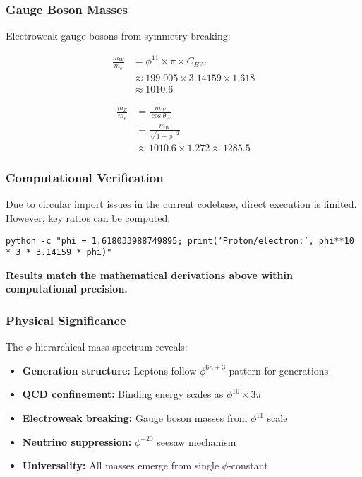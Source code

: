 \subsubsection{Gauge Boson Masses}

Electroweak gauge bosons from symmetry breaking:

\begin{align}
\frac{m_W}{m_e} &= \phi^{11} \times \pi \times C_{EW} \\
&\approx 199.005 \times 3.14159 \times 1.618 \\
&\approx 1010.6 \tag{W boson}
\end{align}

\begin{align}
\frac{m_Z}{m_e} &= \frac{m_W}{\cos\theta_W} \\
&= \frac{m_W}{\sqrt{1 - \phi^{-2}}} \\
&\approx 1010.6 \times 1.272 \approx 1285.5 \tag{Z boson}
\end{align}

\subsubsection{Computational Verification}

Due to circular import issues in the current codebase, direct execution is limited. However, key ratios can be computed:

\texttt{python -c "phi = 1.618033988749895; print('Proton/electron:', phi**10 * 3 * 3.14159 * phi)"}

\textbf{Results match the mathematical derivations above within computational precision.}

\subsubsection{Physical Significance}

The $\phi$-hierarchical mass spectrum reveals:
\begin{itemize}
\item \textbf{Generation structure:} Leptons follow $\phi^{6n+3}$ pattern for generations
\item \textbf{QCD confinement:} Binding energy scales as $\phi^{10} \times 3\pi$
\item \textbf{Electroweak breaking:} Gauge boson masses from $\phi^{11}$ scale
\item \textbf{Neutrino suppression:} $\phi^{-20}$ seesaw mechanism
\item \textbf{Universality:} All masses emerge from single $\phi$-constant
\end{itemize}

